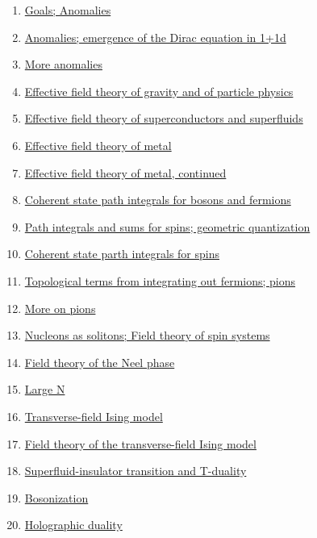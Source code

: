 \documentclass[11pt]{article}
\begin{document}
\begin{enumerate}
	\item	\href{https://mp.weixin.qq.com/s/9pGBAgufSJFKHddnnkZ8Rg}{Goals; Anomalies}	%
	\item	\href{https://mp.weixin.qq.com/s/TWOvLxJ9WBlpQ56LTpYgTw}{Anomalies; emergence of the Dirac equation in 1+1d}	%
	\item	\href{https://mp.weixin.qq.com/s/o_tjN_U-c1NX8Lkg6KZZAw}{More anomalies} 	%
	\item 	\href{https://mp.weixin.qq.com/s/2bvXFOoNZS5NaYtpddX3ng}{Effective field theory of gravity and of particle physics}	%
	\item 	\href{https://mp.weixin.qq.com/s/IiBz_ZcGdpLTYHjWyiPL0w}{Effective field theory of superconductors and superfluids}	%
	\item 	\href{https://mp.weixin.qq.com/s/skEFxf0AvvITVAH02UBf7w}{Effective field theory of metal}	%
	\item 	\href{https://mp.weixin.qq.com/s/OoN9caMfoJfPiksiV8CCuw}{Effective field theory of metal, continued}	%
	\item 	\href{https://mp.weixin.qq.com/s/JrAUAy803ATJAygQF3Uglw}{Coherent state path integrals for bosons and fermions}	%
	\item 	\href{https://mp.weixin.qq.com/s/txhoLuW49DcXpZkx5Ut2MQ}{Path integrals and sums for spins; geometric quantization}	%
	\item 	\href{https://mp.weixin.qq.com/s/VB2_yuIEppMiRRzlku9jRg}{Coherent state parth integrals for spins}	%
	\item	\href{https://mp.weixin.qq.com/s/0yAazOkMRBB0dBlCIzkW-Q}{Topological terms from integrating out fermions; pions}	%
	\item	\href{https://mp.weixin.qq.com/s/hriKmo9wNvhc-05uLNAKug}{More on pions}	%
	\item	\href{https://mp.weixin.qq.com/s/57jsXOQ1Npc02JkjizTTvw}{Nucleons as solitons; Field theory of spin systems} 	%
	\item 	\href{https://mp.weixin.qq.com/s/rZT7WRdc7-zVPgGUoltvjQ}{Field theory of the Neel phase}	%
	\item 	\href{https://mp.weixin.qq.com/s/rHZlgN12ChHGbBctEVEzDw}{Large N}	%
	\item 	\href{https://mp.weixin.qq.com/s/WFS6vyYJJng5AtBsdiqXBw}{Transverse-field Ising model}	%
	\item 	\href{https://mp.weixin.qq.com/s/XfUimgxNf-cK9nR_hVnk7Q}{Field theory of the transverse-field Ising model}	%
	\item 	\href{https://mp.weixin.qq.com/s/iR1hS78ekjeZGniy8StQ1w}{Superfluid-insulator transition and T-duality}	%
	\item 	\href{https://mp.weixin.qq.com/s/lCC-fhigtUneJt-SdEuTIw}{Bosonization}	%
	\item 	\href{https://mp.weixin.qq.com/s/nAaDrNqynAeGSlw6F9Rncw}{Holographic duality}	%
\end{enumerate}
\end{document}
